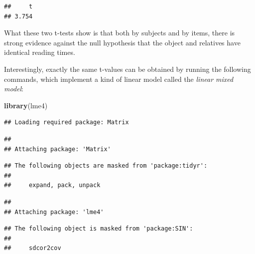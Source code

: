 \documentclass[12pt,]{krantz}
\newenvironment{Shaded}{\begin{snugshade}}{\end{snugshade}}
\newcommand{\DataTypeTok}[1]{\textcolor[rgb]{0.13,0.29,0.53}{#1}}
\newcommand{\DecValTok}[1]{\textcolor[rgb]{0.00,0.00,0.81}{#1}}
\newcommand{\KeywordTok}[1]{\textcolor[rgb]{0.13,0.29,0.53}{\textbf{#1}}}
\newcommand{\NormalTok}[1]{#1}
\newcommand{\OperatorTok}[1]{\textcolor[rgb]{0.81,0.36,0.00}{\textbf{#1}}}
\newcommand{\OtherTok}[1]{\textcolor[rgb]{0.56,0.35,0.01}{#1}}
\begin{document}
\begin{Shaded}
\end{Shaded}

\begin{verbatim}
##     t 
## 3.754
\end{verbatim}

What these two t-tests show is that both by subjects and by items, there is strong evidence against the null hypothesis that the object and relatives have identical reading times.

Interestingly, exactly the same t-values can be obtained by running the following commands, which implement a kind of linear model called the \emph{linear mixed model}:

\begin{Shaded}
\begin{Highlighting}[]
\KeywordTok{library}\NormalTok{(lme4)}
\end{Highlighting}
\end{Shaded}

\begin{verbatim}
## Loading required package: Matrix
\end{verbatim}

\begin{verbatim}
## 
## Attaching package: 'Matrix'
\end{verbatim}

\begin{verbatim}
## The following objects are masked from 'package:tidyr':
## 
##     expand, pack, unpack
\end{verbatim}

\begin{verbatim}
## 
## Attaching package: 'lme4'
\end{verbatim}

\begin{verbatim}
## The following object is masked from 'package:SIN':
## 
##     sdcor2cov
\end{verbatim}

\begin{Shaded}
\end{Shaded}
\end{document}
